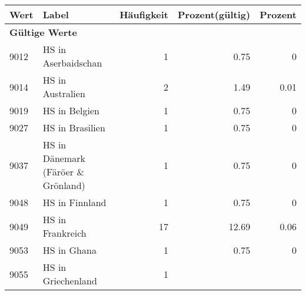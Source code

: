      \begin{longtable}{lXrrr}
     \toprule
     \textbf{Wert} & \textbf{Label} & \textbf{Häufigkeit} & \textbf{Prozent(gültig)} & \textbf{Prozent} \\
     \endhead
     \midrule
     \multicolumn{5}{l}{\textbf{Gültige Werte}}\\
        9012 & \multicolumn{1}{X}{HS in Aserbaidschan} & %
          \num{1} &
          \num[round-mode=places,round-precision=2]{0,75} &
          \num[round-mode=places,round-precision=2]{0} \\
        9014 & \multicolumn{1}{X}{HS in Australien} & %
          \num{2} &
          \num[round-mode=places,round-precision=2]{1,49} &
          \num[round-mode=places,round-precision=2]{0,01} \\
        9019 & \multicolumn{1}{X}{HS in Belgien} & %
          \num{1} &
          \num[round-mode=places,round-precision=2]{0,75} &
          \num[round-mode=places,round-precision=2]{0} \\
        9027 & \multicolumn{1}{X}{HS in Brasilien} & %
          \num{1} &
          \num[round-mode=places,round-precision=2]{0,75} &
          \num[round-mode=places,round-precision=2]{0} \\
        9037 & \multicolumn{1}{X}{HS in Dänemark (Färöer \& Grönland)} & %
          \num{1} &
          \num[round-mode=places,round-precision=2]{0,75} &
          \num[round-mode=places,round-precision=2]{0} \\
        9048 & \multicolumn{1}{X}{HS in Finnland} & %
          \num{1} &
          \num[round-mode=places,round-precision=2]{0,75} &
          \num[round-mode=places,round-precision=2]{0} \\
        9049 & \multicolumn{1}{X}{HS in Frankreich} & %
          \num{17} &
          \num[round-mode=places,round-precision=2]{12,69} &
          \num[round-mode=places,round-precision=2]{0,06} \\
        9053 & \multicolumn{1}{X}{HS in Ghana} & %
          \num{1} &
          \num[round-mode=places,round-precision=2]{0,75} &
          \num[round-mode=places,round-precision=2]{0} \\
        9055 & \multicolumn{1}{X}{HS in Griechenland} & %
          \num{1} &

\end{longtable}
